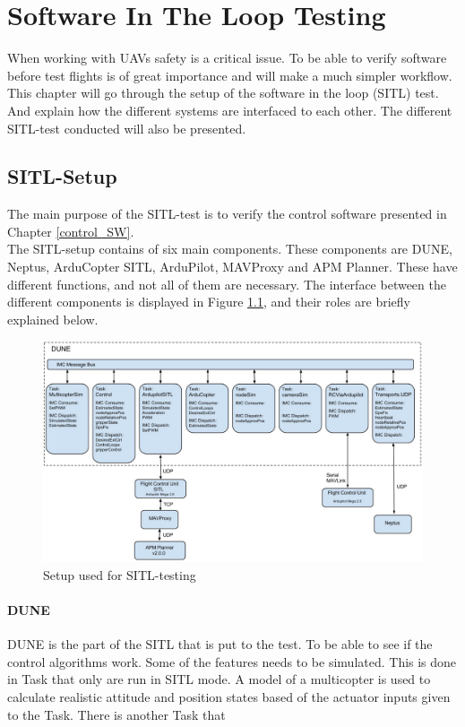 \chapter{Software In The Loop Testing}
When working with UAVs safety is a critical issue. To be able to verify software before test flights is of great importance and will make a much simpler workflow. This chapter will go through the setup of the software in the loop (SITL) test. And explain how the different systems are interfaced to each other. The different SITL-test conducted will also be presented.
\section{SITL-Setup}
The main purpose of the SITL-test is to verify the control software presented in Chapter \ref{control_SW}.\\
\newline
The SITL-setup contains of six main components. These components are DUNE, Neptus, ArduCopter SITL, ArduPilot, MAVProxy and APM Planner. These have different functions, and not all of them are necessary. The interface between the different components is displayed in Figure \ref{sitl}, and their roles are briefly explained below.
\begin{figure}[H]
\centering
\includegraphics[width = 17cm]{fig/Simulation.jpg}
\caption{Setup used for SITL-testing}
\label{sitl}
\end{figure}
\subsubsection*{DUNE}
DUNE is the part of the SITL that is put to the test. To be able to see if the control algorithms work. Some of the features needs to be simulated. This is done in Task that only are run in SITL mode. A model of a multicopter is used to calculate realistic attitude and position states based of the actuator inputs given to the Task. There is another Task that  
